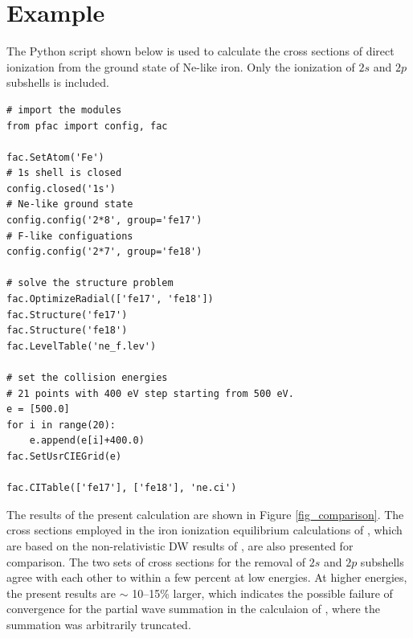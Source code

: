 \documentclass{elsart}
\begin{document}
\section{Example}
\label{sec_example}
The Python script shown below is used to calculate the cross sections of
direct ionization from the ground state of Ne-like iron. Only the ionization
of $2s$ and $2p$ subshells is included.
\begin{verbatim}
# import the modules
from pfac import config, fac

fac.SetAtom('Fe')
# 1s shell is closed
config.closed('1s')
# Ne-like ground state
config.config('2*8', group='fe17')
# F-like configuations
config.config('2*7', group='fe18')

# solve the structure problem
fac.OptimizeRadial(['fe17', 'fe18'])
fac.Structure('fe17')
fac.Structure('fe18')
fac.LevelTable('ne_f.lev')

# set the collision energies
# 21 points with 400 eV step starting from 500 eV.
e = [500.0]
for i in range(20):
    e.append(e[i]+400.0)
fac.SetUsrCIEGrid(e)

fac.CITable(['fe17'], ['fe18'], 'ne.ci')
\end{verbatim}

The results of the present calculation are shown in Figure
\ref{fig_comparison}. The cross sections employed in the
iron ionization equilibrium calculations of \citet{arnaud92}, which are
based on the non-relativistic DW results of \citet{younger82}, are also
presented for comparison. The two sets of cross sections for the removal of
$2s$ and $2p$ subshells agree with each other to within a few percent at low
energies. At higher energies, the present results are $\sim$ 10--15\% larger,
which indicates the possible failure of convergence for the partial wave
summation in the calculaion of \citet{younger82}, where the summation was
arbitrarily truncated. 
\end{document}
